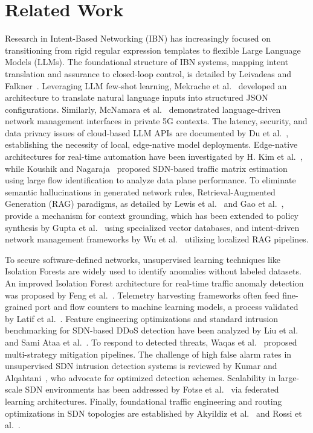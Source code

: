 \documentclass[conference]{IEEEtran}
\begin{document}
\section{Related Work}
Research in Intent-Based Networking (IBN) has increasingly focused on transitioning from rigid regular expression templates to flexible Large Language Models (LLMs). The foundational structure of IBN systems, mapping intent translation and assurance to closed-loop control, is detailed by Leivadeas and Falkner~\cite{b1_leivadeas}. Leveraging LLM few-shot learning, Mekrache et al.~\cite{b2_mekrache} developed an architecture to translate natural language inputs into structured JSON configurations. Similarly, McNamara et al.~\cite{b4_mcnamara} demonstrated language-driven network management interfaces in private 5G contexts. The latency, security, and data privacy issues of cloud-based LLM APIs are documented by Du et al.~\cite{b3_du}, establishing the necessity of local, edge-native model deployments. Edge-native architectures for real-time automation have been investigated by H. Kim et al.~\cite{b19_kim}, while Koushik and Nagaraja~\cite{b15_koushik} proposed SDN-based traffic matrix estimation using large flow identification to analyze data plane performance. To eliminate semantic hallucinations in generated network rules, Retrieval-Augmented Generation (RAG) paradigms, as detailed by Lewis et al.~\cite{b11_lewis} and Gao et al.~\cite{b10_gao}, provide a mechanism for context grounding, which has been extended to policy synthesis by Gupta et al.~\cite{b16_gupta} using specialized vector databases, and intent-driven network management frameworks by Wu et al.~\cite{b17_wu} utilizing localized RAG pipelines.

To secure software-defined networks, unsupervised learning techniques like Isolation Forests are widely used to identify anomalies without labeled datasets. An improved Isolation Forest architecture for real-time traffic anomaly detection was proposed by Feng et al.~\cite{b7_feng}. Telemetry harvesting frameworks often feed fine-grained port and flow counters to machine learning models, a process validated by Latif et al.~\cite{b5_latif}. Feature engineering optimizations and standard intrusion benchmarking for SDN-based DDoS detection have been analyzed by Liu et al.~\cite{b9_liu} and Sami Ataa et al.~\cite{b8_ataa}. To respond to detected threats, Waqas et al.~\cite{b13_waqas} proposed multi-strategy mitigation pipelines. The challenge of high false alarm rates in unsupervised SDN intrusion detection systems is reviewed by Kumar and Alqahtani~\cite{b6_kumar}, who advocate for optimized detection schemes. Scalability in large-scale SDN environments has been addressed by Fotse et al.~\cite{b14_fotse} via federated learning architectures. Finally, foundational traffic engineering and routing optimizations in SDN topologies are established by Akyildiz et al.~\cite{b18_akyildiz} and Rossi et al.~\cite{b20_rossi}.
\end{document}
